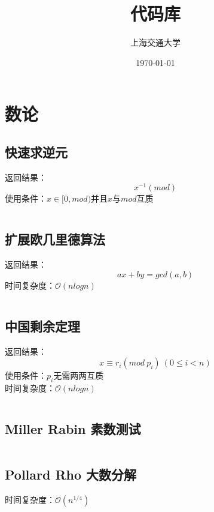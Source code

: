\documentclass[a4paper]{article}
\title{代码库}
\author{上海交通大学}
\date{\today}
\newcommand{\cppcode}[1]{
    \inputminted[mathescape]{cpp}{source/#1}
}
\begin{document}
\maketitle

\tableofcontents

\clearpage

\section{数论}

\subsection{快速求逆元}

返回结果：$$x^{-1}(mod)$$
\indent 使用条件：$x \in [0, mod)$并且$x$与$mod$互质

\cppcode{number-theory/inverse.cpp}

\subsection{扩展欧几里德算法}

返回结果：$$ax+by=gcd(a,b)$$
\indent 时间复杂度：$\mathcal{O}(nlogn)$

\cppcode{number-theory/extended-euclid.cpp}

\subsection{中国剩余定理}

返回结果：$$x \equiv r_i (mod \ p_i) \ (0 \leq i < n)$$
\indent 使用条件：$p_i$无需两两互质\\
\indent 时间复杂度：$\mathcal{O}(nlogn)$

\cppcode{number-theory/chinese-remainder-theorem.cpp}

\subsection{Miller Rabin 素数测试}

\cppcode{number-theory/miller-rabin.cpp}

\subsection{Pollard Rho 大数分解}

时间复杂度：$\mathcal{O}(n^{1/4})$

\cppcode{number-theory/pollard-rho.cpp}
\end{document}
